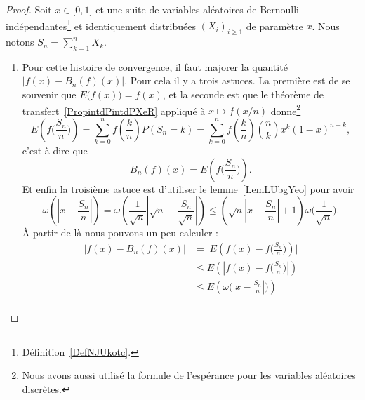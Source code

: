 \begin{proof}
	Soit \( x\in \mathopen[ 0 , 1 \mathclose]\) et une suite de variables aléatoires de Bernoulli indépendantes\footnote{Définition~\ref{DefNJUkotc}.} et identiquement distribuées \( (X_i)_{i\geq 1}\) de paramètre \( x\). Nous notons \( S_n=\sum_{k=1}^nX_k\).

	\begin{enumerate}
		\item

		      Pour cette histoire de convergence, il faut majorer la quantité \( \big| f(x)-B_n(f)(x) \big|\). Pour cela il y a trois astuces. La première est de se souvenir que \( E\big( f(x) \big)=f(x)\), et la seconde est que le théorème de transfert~\ref{PropintdPintdPXeR} appliqué à \( x\mapsto f(x/n)\) donne\footnote{Nous avons aussi utilisé la formule de l'espérance pour les variables aléatoires discrètes.}
		      \begin{equation}
			      E\left( f\big( \frac{ S_n }{ n } \big) \right)=\sum_{k=0}^nf\left( \frac{ k }{ n } \right)P(S_n=k)=\sum_{k=0}^nf\left( \frac{ k }{ n } \right)\binom{ n }{ k }x^k(1-x)^{n-k},
		      \end{equation}
		      c'est-à-dire que
		      \begin{equation}
			      B_n(f)(x)=E\left( f\big( \frac{ S_n }{ n } \big) \right).
		      \end{equation}
		      Et enfin la troisième astuce est d'utiliser le lemme~\ref{LemLUbgYeo} pour avoir
		      \begin{equation}
			      \omega\left( | x-\frac{ S_n }{ n } | \right)=\omega\left( \frac{1}{ \sqrt{n} }| \sqrt{n}-\frac{ S_n }{ \sqrt{n} } | \right)\leq
			      \left( \sqrt{n}| x-\frac{ S_n }{ n } |+1 \right)\omega\big( \frac{1}{ \sqrt{n} } \big).
		      \end{equation}
		      À partir de là nous pouvons un peu calculer :
		      \begin{subequations}
			      \begin{align}
				      \big| f(x)-B_n(f)(x) \big| & =\Big| E\left( f(x)-f\big( \frac{ S_n }{ n } \big) \right)    \Big|                              \\
				                                 & \leq E\left( | f(x)-f\big( \frac{ S_n }{ n } \big) | \right)                                     \\
				                                 & \leq E\left( \omega\Big( | x-\frac{ S_n }{ n } | \Big) \right)                                   \\

\end{align}
\end{subequations}
\end{enumerate}
\end{proof}

